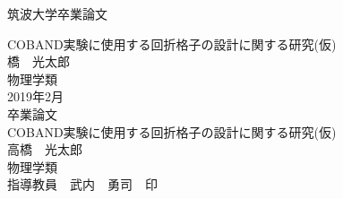 \thispagestyle{empty}
\begin{center}
\LARGE
筑波大学卒業論文 \\
\vspace{1.5 cm}

\LARGE
\vspace{4 cm}
COBAND実験に使用する回折格子の設計に関する研究(仮)\\
\vspace{8 cm}
\LARGE
{}橋　光太郎 \\
物理学類
\\
\vspace{1.5 cm}
2019年2月\\
\rm
\newpage
\thispagestyle{empty}
\mbox{}\newpage
\newpage
\thispagestyle{empty}
\LARGE
卒業論文 \\
\LARGE
\vspace{4 cm}
COBAND実験に使用する回折格子の設計に関する研究(仮)\\
\vspace{8 cm}
\LARGE
高橋　光太郎 \\
物理学類\\
\vspace{1.5 cm}
指導教員　武内　勇司　印\\
\end{center}
\rm

\newpage
\thispagestyle{empty}
\mbox{}\newpage

